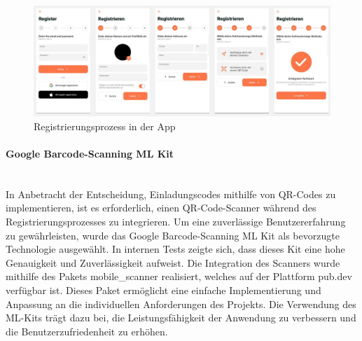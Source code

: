 \begin{figure}[h]
  \centering
  \includegraphics[width=\textwidth]{pics/registration-process.JPG}
  \caption{Registrierungsprozess in der App}
  \label{fig:registration-process}
\end{figure}


\paragraph{Google Barcode-Scanning ML Kit}\mbox{} \\
In Anbetracht der Entscheidung, Einladungscodes mithilfe von QR-Codes zu implementieren, ist es erforderlich, einen QR-Code-Scanner während des Registrierungsprozesses zu integrieren. Um eine zuverlässige Benutzererfahrung zu gewährleisten, wurde das Google Barcode-Scanning ML Kit als bevorzugte Technologie ausgewählt. In internen Tests zeigte sich, dass dieses Kit eine hohe Genauigkeit und Zuverlässigkeit aufweist.
Die Integration des Scanners wurde mithilfe des Pakets \cite{mobile_scanner} mobile\_scanner realisiert, welches auf der Plattform pub.dev verfügbar ist. Dieses Paket ermöglicht eine einfache Implementierung und Anpassung an die individuellen Anforderungen des Projekts. Die Verwendung des ML-Kits trägt dazu bei, die Leistungsfähigkeit der Anwendung zu verbessern und die Benutzerzufriedenheit zu erhöhen.



